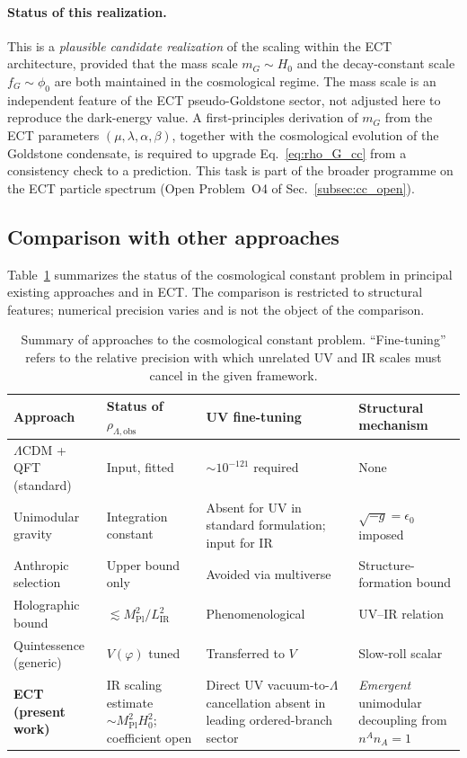 \paragraph{Status of this realization.} This is a \emph{plausible
candidate realization} of the scaling within the ECT architecture,
provided that the mass scale $m_G \sim H_0$ and the decay-constant
scale $f_G \sim \phi_0$ are both maintained in the cosmological
regime. The mass scale is an independent feature of the ECT
pseudo-Goldstone sector, not adjusted here to reproduce the
dark-energy value. A first-principles derivation of $m_G$ from the
ECT parameters $(\mu,\lambda,\alpha,\beta)$, together with the
cosmological evolution of the Goldstone condensate, is required to
upgrade Eq.~\eqref{eq:rho_G_cc} from a consistency check to a
prediction. This task is part of the broader programme on the ECT
particle spectrum (Open Problem~O4 of
Sec.~\ref{subsec:cc_open}).

\subsection{Comparison with other approaches}
\label{subsec:comparison_cc}

Table~\ref{tab:cc_approaches} summarizes the status of the
cosmological constant problem in principal existing approaches and in
ECT. The comparison is restricted to structural features; numerical
precision varies and is not the object of the comparison.

{\small
\begin{longtable}{p{3.2cm} p{3.5cm} p{3.2cm} p{4.0cm}}
\caption{Summary of approaches to the cosmological constant problem.
``Fine-tuning'' refers to the relative precision with which unrelated
UV and IR scales must cancel in the given framework.}
\label{tab:cc_approaches}\\
\toprule
\textbf{Approach} &
\textbf{Status of $\rho_{\Lambda,\mathrm{obs}}$} &
\textbf{UV fine-tuning} &
\textbf{Structural mechanism} \\
\midrule
$\Lambda$CDM + QFT (standard) &
Input, fitted &
$\sim 10^{-121}$ required &
None \\Unimodular gravity~\cite{HenneauxTeitelboim1989} &
Integration constant &
Absent for UV in standard formulation; input for IR &
$\sqrt{-g} = \epsilon_0$ imposed \\
Anthropic selection~\cite{Weinberg1987} &
Upper bound only &
Avoided via multiverse &
Structure-formation bound \\
Holographic bound~\cite{CohenKaplanNelson1999} &
$\lesssim M_{\mathrm{Pl}}^2 / L_{\mathrm{IR}}^2$ &
Phenomenological &
UV--IR relation \\
Quintessence (generic) &
$V(\varphi)$ tuned &
Transferred to $V$ &
Slow-roll scalar \\
\textbf{ECT (present work)} &
IR scaling estimate $\sim M_{\mathrm{Pl}}^2 H_0^2$; coefficient open &
Direct UV vacuum-to-$\Lambda$ cancellation absent in leading ordered-branch sector &
\emph{Emergent} unimodular decoupling from $n^A n_A = 1$ \\
\bottomrule
\end{longtable}}

